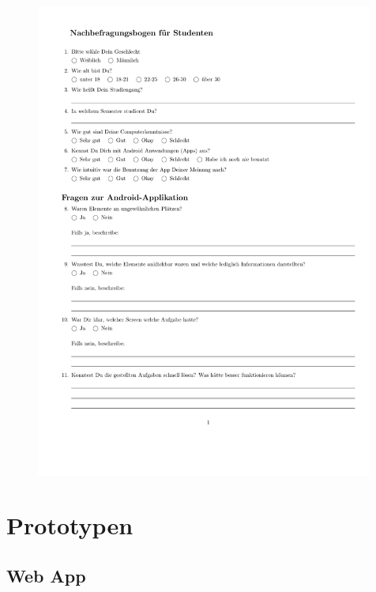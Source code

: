 \begin{figure}
  \vspace{-20pt}
  \begin{center}
    \includegraphics[page=3,width=0.99\textwidth]{./images/student}
  \end{center}
  \vspace{-40pt}
\end{figure}

\clearpage
\section{Prototypen}
\label{sec:prototypen}

\subsection{Web App}

